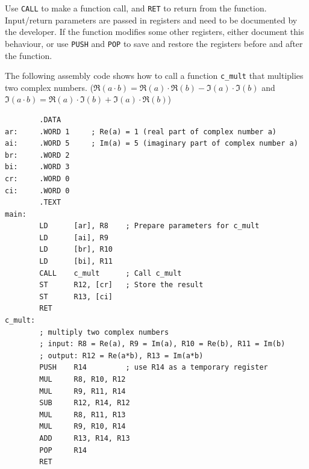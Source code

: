 \begin{enumerate}
Use \texttt{CALL} to make a function call, and \texttt{RET} to return from the function.
Input/return parameters are passed in registers and need to be documented by the developer.
If the function modifies some other registers, either document this behaviour, or use
\texttt{PUSH} and \texttt{POP} to save and restore the registers before and after the
function.
\begin{example}
    The following assembly code shows how to call a function \texttt{c\_mult} that
    multiplies two complex numbers.
    ($\Re(a\cdot b) = \Re(a)\cdot\Re(b) - \Im(a)\cdot\Im(b)$ and
    $\Im(a\cdot b) = \Re(a)\cdot\Im(b) + \Im(a)\cdot\Re(b)$)
\begin{verbatim}
        .DATA
ar:     .WORD 1     ; Re(a) = 1 (real part of complex number a)
ai:     .WORD 5     ; Im(a) = 5 (imaginary part of complex number a)
br:     .WORD 2
bi:     .WORD 3
cr:     .WORD 0
ci:     .WORD 0
        .TEXT
main:
        LD      [ar], R8    ; Prepare parameters for c_mult
        LD      [ai], R9
        LD      [br], R10
        LD      [bi], R11
        CALL    c_mult      ; Call c_mult
        ST      R12, [cr]   ; Store the result
        ST      R13, [ci]
        RET
c_mult: 
        ; multiply two complex numbers
        ; input: R8 = Re(a), R9 = Im(a), R10 = Re(b), R11 = Im(b)
        ; output: R12 = Re(a*b), R13 = Im(a*b)
        PUSH    R14         ; use R14 as a temporary register
        MUL     R8, R10, R12
        MUL     R9, R11, R14
        SUB     R12, R14, R12
        MUL     R8, R11, R13
        MUL     R9, R10, R14
        ADD     R13, R14, R13
        POP     R14
        RET
\end{verbatim}
\end{example}

\end{enumerate}
